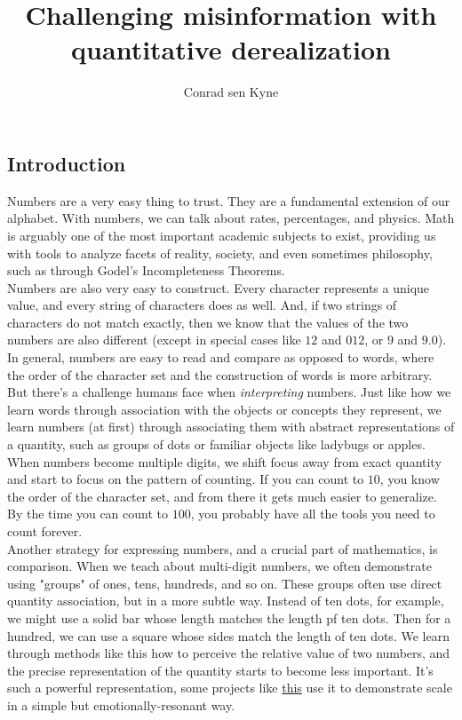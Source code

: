 \documentclass{article}
\title{\Large Challenging misinformation with quantitative derealization}
\author{Conrad sen Kyne}
\date{}
\begin{document}
\maketitle

\subsection*{Introduction}

\hspace{\parindent}Numbers are a very easy thing to trust. They are a fundamental extension of our alphabet. With numbers, we can talk about rates, percentages, and physics. Math is arguably one of the most important academic subjects to exist, providing us with tools to analyze facets of reality, society, and even sometimes philosophy, such as through Godel's Incompleteness Theorems.\\

Numbers are also very easy to construct. Every character represents a unique value, and every string of characters does as well. And, if two strings of characters do not match exactly, then we know that the values of the two numbers are also different (except in special cases like $12$ and $012$, or $9$ and $9.0$). In general, numbers are easy to read and compare as opposed to words, where the order of the character set and the construction of words is more arbitrary.\\

But there's a challenge humans face when \textit{interpreting} numbers. Just like how we learn words through association with the objects or concepts they represent, we learn numbers (at first) through associating them with abstract representations of a quantity, such as groups of dots or familiar objects like ladybugs or apples. When numbers become multiple digits, we shift focus away from exact quantity and start to focus on the pattern of counting. If you can count to $10$, you know the order of the character set, and from there it gets much easier to generalize. By the time you can count to $100$, you probably have all the tools you need to count forever.\\

Another strategy for expressing numbers, and a crucial part of mathematics, is comparison. When we teach about multi-digit numbers, we often demonstrate using "groups" of ones, tens, hundreds, and so on. These groups often use direct quantity association, but in a more subtle way. Instead of ten dots, for example, we might use a solid bar whose length matches the length pf ten dots. Then for a hundred, we can use a square whose sides match the length of ten dots. We learn through methods like this how to perceive the relative value of two numbers, and the precise representation of the quantity starts to become less important. It's such a powerful representation, some projects like \href{https://mkorostoff.github.io/1-pixel-wealth/}{this} use it to demonstrate scale in a simple but emotionally-resonant way.
\end{document}
